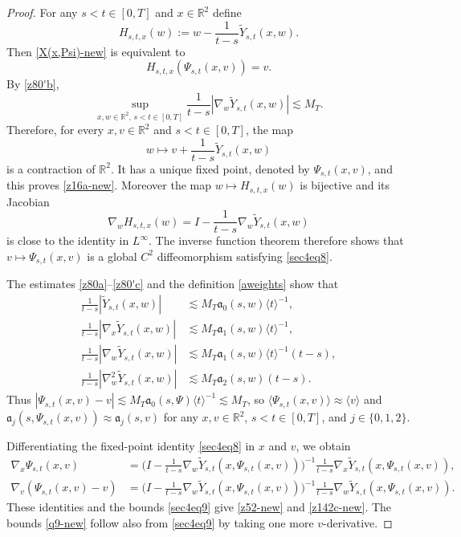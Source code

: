 \documentclass[reqno,11pt]{amsart}
\numberwithin{equation}{section}
\def\R{{\mathbb R}}
\def\R{{\bf R}}
\def\R{\mathbb{R}}
\begin{document}
	\begin{proof} For any $s<t\in[0,T]$ and $x\in\R^2$ define
\[
H_{s,t,x}(w):=w-\frac{1}{t-s}\widetilde Y_{s,t}(x,w).
\]
Then \eqref{X(x,Psi)-new} is equivalent to
\begin{equation}\label{sec4eq8}
H_{s,t,x}(\Psi_{s,t}(x,v))=v.
\end{equation}
By \eqref{z80'b},
\[
\sup_{x,w\in\R^2,\,s<t\in[0,T]}
\frac{1}{t-s}|\nabla_w\widetilde Y_{s,t}(x,w)|
\lesssim M_T.
\]
Therefore, for every $x,v\in\R^2$ and $s<t\in[0,T]$, the map
\[
w\mapsto v+\frac{1}{t-s}\widetilde Y_{s,t}(x,w)
\]
is a contraction of $\R^2$. It has a unique fixed point, denoted by
$\Psi_{s,t}(x,v)$, and this proves \eqref{z16a-new}. Moreover the map $w\mapsto H_{s,t,x}(w)$ is bijective and its Jacobian
\[
\nabla_wH_{s,t,x}(w)=I-\frac{1}{t-s}\nabla_w\widetilde Y_{s,t}(x,w)
\]
is close to the identity in $L^\infty$. The inverse function theorem therefore shows that $v\mapsto\Psi_{s,t}(x,v)$ is a global $C^2$ diffeomorphism satisfying \eqref{sec4eq8}.

The estimates \eqref{z80a}--\eqref{z80'c} and the definition \eqref{aweights} show that
\begin{equation}\label{sec4eq9}
\begin{split}
\frac{1}{t-s}|\widetilde Y_{s,t}(x,w)|
&\lesssim M_T\mathfrak a_0(s,w)\langle t\rangle^{-1},\\
\frac{1}{t-s}|\nabla_x\widetilde Y_{s,t}(x,w)|
&\lesssim M_T\mathfrak a_1(s,w)\langle t\rangle^{-1},\\
\frac{1}{t-s}|\nabla_w\widetilde Y_{s,t}(x,w)|
&\lesssim M_T\mathfrak a_1(s,w)\langle t\rangle^{-1}(t-s),\\
\frac{1}{t-s}|\nabla_w^2\widetilde Y_{s,t}(x,w)|
&\lesssim M_T\mathfrak a_2(s,w)(t-s).
\end{split}
\end{equation}
Thus $|\Psi_{s,t}(x,v)-v|\lesssim M_T\mathfrak a_0(s,\Psi)\langle t\rangle^{-1}\lesssim M_T$, so $\langle\Psi_{s,t}(x,v)\rangle\approx\langle v\rangle$ and $\mathfrak a_j(s,\Psi_{s,t}(x,v))\approx\mathfrak a_j(s,v)$ for any $x,v\in\R^2$, $s<t\in[0,T]$, and  $j\in\{0,1,2\}$.

Differentiating the fixed-point identity \eqref{sec4eq8} in $x$ and $v$, we obtain
\begin{align*}
\nabla_x\Psi_{s,t}(x,v)&=\Big(I-\frac{1}{t-s}\nabla_w\widetilde Y_{s,t}(x,\Psi_{s,t}(x,v))\Big)^{-1}
\frac{1}{t-s}\nabla_x\widetilde Y_{s,t}(x,\Psi_{s,t}(x,v)),\\
\nabla_v(\Psi_{s,t}(x,v)-v)
&=\Big(I-\frac{1}{t-s}\nabla_w\widetilde Y_{s,t}(x,\Psi_{s,t}(x,v))\Big)^{-1}
\frac{1}{t-s}\nabla_w\widetilde Y_{s,t}(x,\Psi_{s,t}(x,v)).
\end{align*}
These identities and the bounds \eqref{sec4eq9} give \eqref{z52-new} and \eqref{z142c-new}. The bounds \eqref{q9-new} follow also from \eqref{sec4eq9} by taking one more $v$-derivative. 
\end{proof}
	
\end{document}
